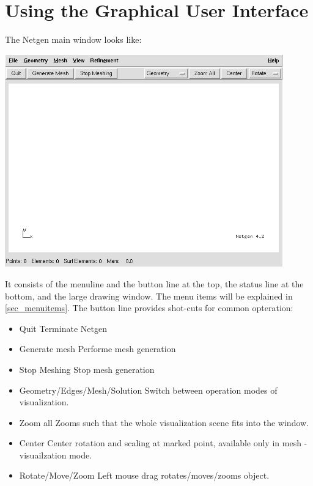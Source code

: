 \documentclass[12pt]{book}
\begin{document}
\chapter{Using the Graphical User Interface}
The Netgen main window looks like:
\begin{center}
\includegraphics[width=12cm]{pictures/screenshot}
\end{center}
It consists of the menuline and the button line at the top, the status line at
the bottom, and the large drawing window. The menu items will be explained in 
\ref{sec_menuitems}. The button line provides shot-cuts for common opteration:
\begin{itemize}
\item Quit \newline
Terminate Netgen
\item Generate mesh \newline
Performe mesh generation 
\item Stop Meshing \newline
Stop mesh generation 
\item Geometry/Edges/Mesh/Solution \newline
Switch between operation modes of visualization.
\item Zoom all \newline
Zooms such that the whole visualization scene fits into the window.
\item Center \newline
Center rotation and scaling at marked point, available only in mesh - visuailzation mode.
\item Rotate/Move/Zoom
Left mouse drag rotates/moves/zooms object.
\end{itemize}
\end{document}
